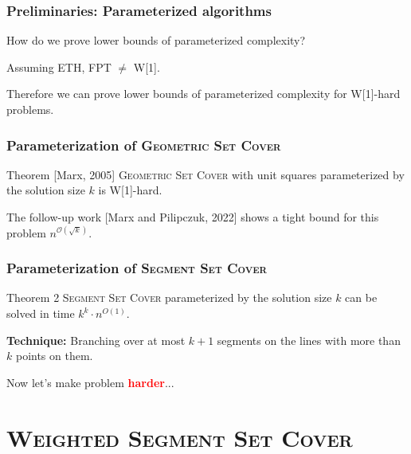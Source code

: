 \documentclass{beamer}
\begin{document}
\begin{frame}
\frametitle{Preliminaries: Parameterized algorithms}

How do we prove lower bounds of parameterized complexity?
\bigskip

Assuming ETH, FPT $\neq$ W[1].

\bigskip

Therefore we can prove lower bounds of parameterized complexity for W[1]-hard problems.

\end{frame}

\begin{frame}
\frametitle{Parameterization of \textsc{Geometric Set Cover}}
\begin{block}{Theorem [Marx, 2005]}
	\textsc{Geometric Set Cover} 
	with unit squares parameterized by the solution size $k$
	is W[1]-hard.
\end{block}

The follow-up work [Marx and Pilipczuk, 2022]
shows a tight bound for this problem $n^{\mathcal{O}(\sqrt{k})}$.

\end{frame}

\begin{frame}
\frametitle{Parameterization of \textsc{Segment Set Cover}}
\begin{block}{Theorem 2}
	\textsc{Segment Set Cover} parameterized by the solution size $k$
	can be solved in time $k^k \cdot n^{O(1)}$.
\end{block}

\textbf{Technique:} Branching over at most $k+1$
segments on the lines with more than $k$ points on them.

\pause

\bigskip

Now let's make problem \textcolor{red}{\textbf{harder}}...

\end{frame}

\section{\textsc{Weighted Segment Set Cover}} 
\end{document}
